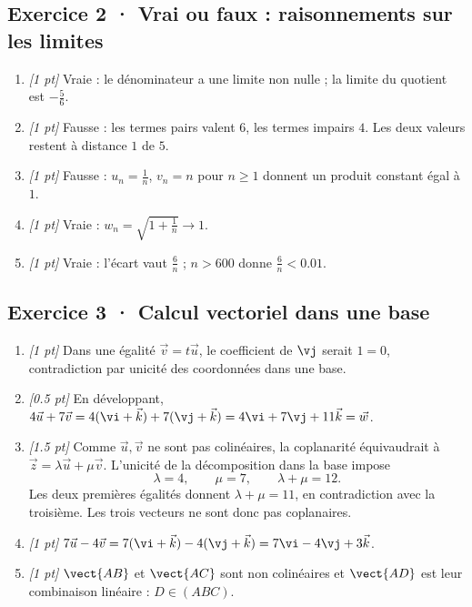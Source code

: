 \subsection*{Exercice 2 · Vrai ou faux : raisonnements sur les limites}\begin{enumerate}

\item \textit{[1 pt]} Vraie : le dénominateur a une limite non nulle ; la limite du quotient est $-\frac{5}{6}$.

\item \textit{[1 pt]} Fausse : les termes pairs valent $6$, les termes impairs $4$. Les deux valeurs restent à distance $1$ de $5$.

\item \textit{[1 pt]} Fausse : $u_n=\frac{1}{n}$, $v_n=n$ pour $n\ge1$ donnent un produit constant égal à $1$.

\item \textit{[1 pt]} Vraie : $w_n=\sqrt{1+\frac{1}{n}}\to1$.

\item \textit{[1 pt]} Vraie : l'écart vaut $\frac{6}{n}$ ; $n>600$ donne $\frac{6}{n}<\num{0,01}$.

\end{enumerate}

\subsection*{Exercice 3 · Calcul vectoriel dans une base}\begin{enumerate}

\item \textit{[1 pt]} Dans une égalité $\vec v=t\vec u$, le coefficient de $\vj $ serait $1=0$, contradiction par unicité des coordonnées dans une base.

\item \textit{[\num{0,5} pt]} En développant, $4\vec u+7\vec v=4(\vi +\vec k)+7(\vj +\vec k)=4\vi +7\vj +11\vec k=\vec w$.

\item \textit{[\num{1,5} pt]} Comme $\vec u,\vec v$ ne sont pas colinéaires, la coplanarité équivaudrait à $\vec z=\lambda\vec u+\mu\vec v$. L'unicité de la décomposition dans la base impose
\[\lambda=4,\qquad\mu=7,\qquad\lambda+\mu=12.\]
Les deux premières égalités donnent $\lambda+\mu=11$, en contradiction avec la troisième. Les trois vecteurs ne sont donc pas coplanaires.

\item \textit{[1 pt]} $7\vec u-4\vec v=7(\vi +\vec k)-4(\vj +\vec k)=7\vi -4\vj +3\vec k$.

\item \textit{[1 pt]} $\vect{AB}$ et $\vect{AC}$ sont non colinéaires et $\vect{AD}$ est leur combinaison linéaire : $D\in(ABC)$.

\end{enumerate}


